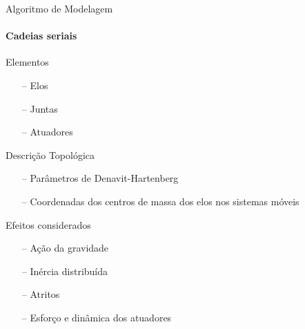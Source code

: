 \documentclass[25pt,landscape]{beamer}
\begin{document}
\begin{frame}{Algoritmo de Modelagem}
    \framesubtitle{Cadeias seriais}
	\pause
    \begin{block}{Elementos}
		\begin{itemize}
			\item[--] Elos
			\item[--] Juntas
			\item[--] Atuadores
		\end{itemize}
    \end{block}
	\pause
    \begin{block}{Descrição Topológica}
		\begin{itemize}
			\item[--] Parâmetros de Denavit-Hartenberg
			\item[--] Coordenadas dos centros de massa dos elos nos sistemas móveis
		\end{itemize}
    \end{block}
	\pause
    \begin{block}{Efeitos considerados}
		\begin{itemize}
			\item[--] Ação da gravidade
			\item[--] Inércia distribuída
			\item[--] Atritos
			\item[--] Esforço e dinâmica dos atuadores
		\end{itemize}
    \end{block}
\end{frame}
\end{document}
